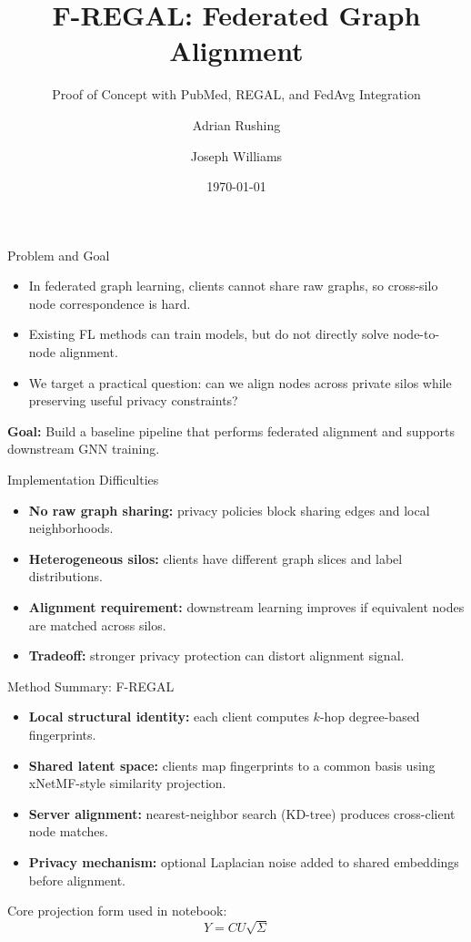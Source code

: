 \documentclass[11pt, aspectratio=169]{beamer}
\title[F-REGAL Final]{F-REGAL: Federated Graph Alignment}
\subtitle{Proof of Concept with PubMed, REGAL, and FedAvg Integration}
\author[Rushing \& Williams]{Adrian Rushing \and Joseph Williams}
\date{\today}
\begin{document}
\begin{frame}
    \titlepage
\end{frame}

\begin{frame}{Problem and Goal}
    \begin{itemize}
        \item In federated graph learning, clients cannot share raw graphs, so cross-silo node correspondence is hard.
        \item Existing FL methods can train models, but do not directly solve node-to-node alignment.
        \item We target a practical question: can we align nodes across private silos while preserving useful privacy constraints?
    \end{itemize}
    \vspace{0.25cm}
    \textbf{Goal:} Build a baseline pipeline that performs federated alignment and supports downstream GNN training.
\end{frame}

\begin{frame}{Implementation Difficulties}
    \begin{itemize}
        \item \textbf{No raw graph sharing:} privacy policies block sharing edges and local neighborhoods.
        \item \textbf{Heterogeneous silos:} clients have different graph slices and label distributions.
        \item \textbf{Alignment requirement:} downstream learning improves if equivalent nodes are matched across silos.
        \item \textbf{Tradeoff:} stronger privacy protection can distort alignment signal.
    \end{itemize}
\end{frame}

\begin{frame}{Method Summary: F-REGAL}
    \begin{itemize}
        \item \textbf{Local structural identity:} each client computes $k$-hop degree-based fingerprints.
        \item \textbf{Shared latent space:} clients map fingerprints to a common basis using xNetMF-style similarity projection.
        \item \textbf{Server alignment:} nearest-neighbor search (KD-tree) produces cross-client node matches.
        \item \textbf{Privacy mechanism:} optional Laplacian noise added to shared embeddings before alignment.
    \end{itemize}
    \vspace{0.2cm}
    Core projection form used in notebook:
    \[
    Y = C U \sqrt{\Sigma}
    \]
\end{frame}
\end{document}
